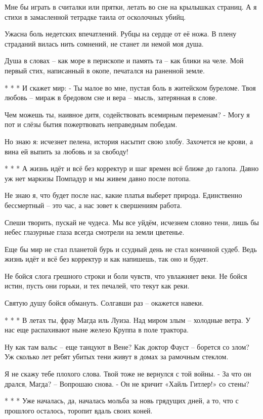Мне бы играть в считалки или прятки,
летать во сне на крылышках страниц.
А я стихи в замасленной тетрадке
таила от осколочных убийц.

Ужасна боль недетских впечатлений.
Рубцы на сердце от её ножа.
В плену страданий вилась нить сомнений,
не станет ли немой моя душа.

Душа в словах – как море в перископе
и память та – как блики на челе.
Мой первый стих, написанный в окопе,
печатался на раненной земле.

* * *
И скажет мир: - Ты малое во мне,
пустая боль в житейском буреломе.
Твоя любовь – мираж в бредовом сне
и вера – мысль, затерянная в слове.

Чем можешь ты, наивное дитя,
содействовать всемирным переменам?
- Могу я пот и слёзы бытия
пожертвовать неправедным победам.

Но знаю я: исчезнет пелена,
история насытит свою злобу.
Захочется не крови, а вина
ей выпить за любовь и за свободу!

* * *
А жизнь идёт и всё без корректур
и шаг времен всё ближе до галопа.
Давно уж нет маркизы Помпадур
и мы  живем давно после потопа.

Не знаю я, что будет после нас,
какие платья выберет природа.
Единственно бессмертный – это час,
а нас зовет к свершениям работа.

Спеши творить, пускай не чудеса.
Мы все уйдём, исчезнем словно тени,
лишь бы небес глазурные глаза
всегда смотрели на земли цветенье.

Еще бы мир не стал планетой бурь
и ссудный день не стал кончиной судеб.
Ведь жизнь идёт и всё без корректур
и как напишешь, так оно и будет.

Не бойся слога грешного строки
и боли чувств, что увлажняет веки.
Не бойся истин, пусть они горьки,
и тех печалей, что текут как реки.

Святую душу бойся обмануть.
Солгавши раз – окажется навеки.

* * *
В летах ты, фрау Магда иль Луиза.
Над миром злым – холодные ветра.
У нас еще распахивают ныне
железо Круппа в поле трактора.

Ну как там вальс – еще танцуют в Вене?
Как доктор Фауст – борется со злом?
Уж сколько лет ребят убитых тени
живут в домах за рамочным стеклом.

Я не скажу тебе плохого слова.
Твой тоже не вернулся с той войны.
- За что он дрался, Магда? – Вопрошаю снова.
- Он не кричит «Хайль Гитлер!» со стены?

* * *
Уже началась, да, началась
мольба за новь  грядущих дней,
а то, что с прошлого осталось,
торопит вдаль своих коней.

